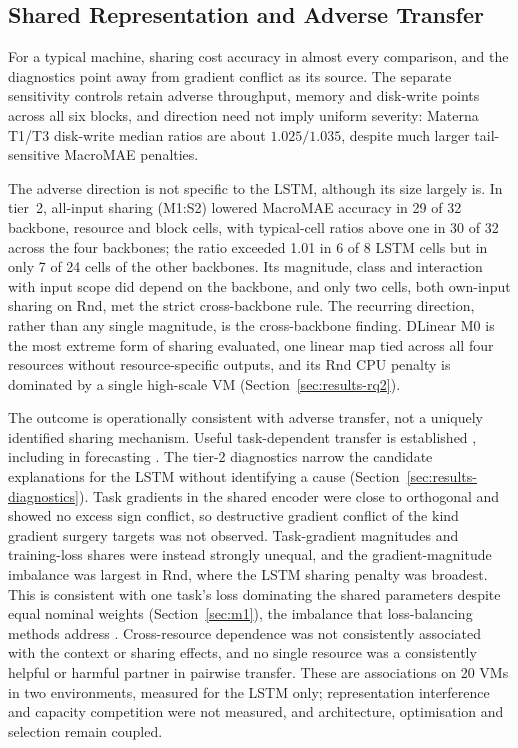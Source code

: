 \documentclass[5p,twocolumn]{elsarticle}
\begin{document}
\subsection{Shared Representation and Adverse Transfer}
\label{sec:discussion-sharing}

For a typical machine, sharing cost accuracy in almost every comparison, and
the diagnostics point away from gradient conflict as its source. The separate
sensitivity controls retain adverse throughput, memory and disk-write points
across all six blocks, and direction need not imply uniform
severity: Materna T1/T3 disk-write median ratios are about $1.025/1.035$,
despite much larger tail-sensitive MacroMAE penalties.

The adverse direction is not specific to the LSTM, although its size
largely is. In tier~2, all-input sharing (M1:S2) lowered MacroMAE accuracy in
29 of 32 backbone, resource and block cells, with typical-cell ratios above
one in 30 of 32 across the four backbones; the ratio exceeded 1.01 in 6 of 8
LSTM cells but in only 7 of 24 cells of the other backbones. Its
magnitude, class and interaction with input scope did depend on the
backbone, and only two cells, both own-input sharing on Rnd, met the strict
cross-backbone rule. The recurring direction, rather than any single
magnitude, is the cross-backbone finding. DLinear M0 is the most extreme
form of sharing evaluated, one linear map tied across all four resources
without resource-specific outputs, and its Rnd CPU penalty is dominated by a
single high-scale VM (Section~\ref{sec:results-rq2}).

The outcome is operationally consistent with adverse transfer, not a uniquely
identified sharing mechanism. Useful task-dependent transfer is established
\citep{Caruana1997Multitask,Standley2020TaskGrouping,Fifty2021TaskGroupings},
including in forecasting \citep{Nikentari2022NARMAXLSTM,Nochumsohn2025MTLinear}.
The tier-2 diagnostics narrow the candidate explanations for the LSTM
without identifying a cause (Section~\ref{sec:results-diagnostics}). Task
gradients in the shared encoder were close to orthogonal and showed no
excess sign conflict, so destructive gradient conflict of the kind gradient
surgery targets \citep{Yu2020GradientSurgery} was not observed. Task-gradient
magnitudes and training-loss shares were instead strongly unequal, and the
gradient-magnitude imbalance was largest in Rnd, where the LSTM sharing
penalty was broadest. This is consistent
with one task's loss dominating the shared parameters despite equal nominal
weights (Section~\ref{sec:m1}), the imbalance that loss-balancing methods
address \citep{Chen2018GradNorm}. Cross-resource dependence was not
consistently associated with the context or sharing effects, and no single resource was a consistently
helpful or harmful partner in pairwise transfer. These are associations on
20 VMs in two environments, measured for the LSTM only; representation
interference and capacity competition were not measured, and architecture,
optimisation and selection remain coupled.
\end{document}

